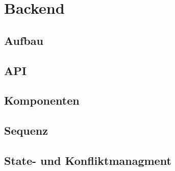 \section{Backend}

\subsection{Aufbau}

\subsection{API}

\subsection{Komponenten}

\subsection{Sequenz}

\subsection{State- und Konfliktmanagment}
